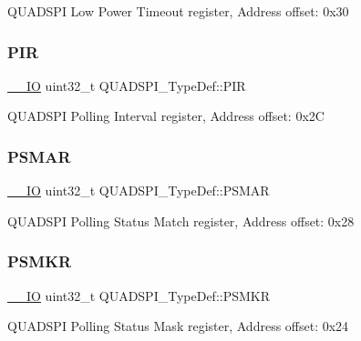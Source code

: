 Q\+U\+A\+D\+S\+PI Low Power Timeout register, Address offset\+: 0x30 \mbox{\label{struct_q_u_a_d_s_p_i___type_def_a75e800640a43256743699e865edcea91}} 
\subsubsection{\texorpdfstring{PIR}{PIR}}
{\footnotesize\ttfamily \mbox{\hyperlink{core__sc300_8h_aec43007d9998a0a0e01faede4133d6be}{\+\_\+\+\_\+\+IO}} uint32\+\_\+t Q\+U\+A\+D\+S\+P\+I\+\_\+\+Type\+Def\+::\+P\+IR}

Q\+U\+A\+D\+S\+PI Polling Interval register, Address offset\+: 0x2C \mbox{\label{struct_q_u_a_d_s_p_i___type_def_a380877fcd114e30bba84898c139ca540}} 
\subsubsection{\texorpdfstring{PSMAR}{PSMAR}}
{\footnotesize\ttfamily \mbox{\hyperlink{core__sc300_8h_aec43007d9998a0a0e01faede4133d6be}{\+\_\+\+\_\+\+IO}} uint32\+\_\+t Q\+U\+A\+D\+S\+P\+I\+\_\+\+Type\+Def\+::\+P\+S\+M\+AR}

Q\+U\+A\+D\+S\+PI Polling Status Match register, Address offset\+: 0x28 \mbox{\label{struct_q_u_a_d_s_p_i___type_def_a834e5dc7b51e2ab38570f6fcc6343b16}} 
\subsubsection{\texorpdfstring{PSMKR}{PSMKR}}
{\footnotesize\ttfamily \mbox{\hyperlink{core__sc300_8h_aec43007d9998a0a0e01faede4133d6be}{\+\_\+\+\_\+\+IO}} uint32\+\_\+t Q\+U\+A\+D\+S\+P\+I\+\_\+\+Type\+Def\+::\+P\+S\+M\+KR}

Q\+U\+A\+D\+S\+PI Polling Status Mask register, Address offset\+: 0x24 \mbox{\label{struct_q_u_a_d_s_p_i___type_def_acbabc913eb6a81051e7a73297d1b0756}} 
